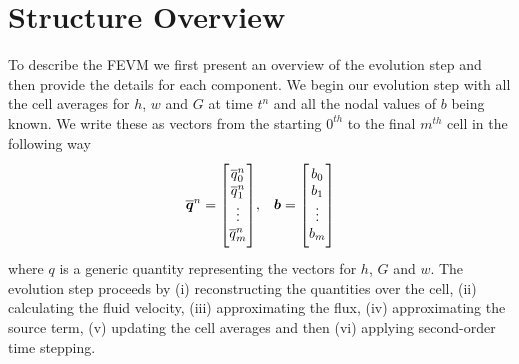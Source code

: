 \section{Structure Overview}
\label{sec:StructOverview}
To describe the FEVM we first present an overview of the evolution step and then provide the details for each component. We begin our evolution step with all the cell averages for $h$, $w$ and $G$ at time $t^n$ and all the nodal values of $b$ being known. We write these as vectors from the starting $0^{th}$ to the final $m^{th}$ cell in the following way
\begin{align*} \overline{\vecn{q}}^n = \begin{bmatrix} \TM
\overline{q}_0^n \\\overline{q}_1^n \\ \vdots \\ \overline{q}_m^n \BM\end{bmatrix} & , & \vecn{b} = \begin{bmatrix} \TM
b_{0} \\ b_{1} \\ \vdots \\b_{m} \BM
\end{bmatrix} \\
\end{align*}
where $q$ is a generic quantity representing the vectors for $h$, $G$ and $w$. The evolution step proceeds by (i) reconstructing the quantities over the cell, (ii) calculating the fluid velocity, (iii) approximating the flux, (iv) approximating the source term, (v) updating the cell averages and then (vi) applying second-order time stepping.

